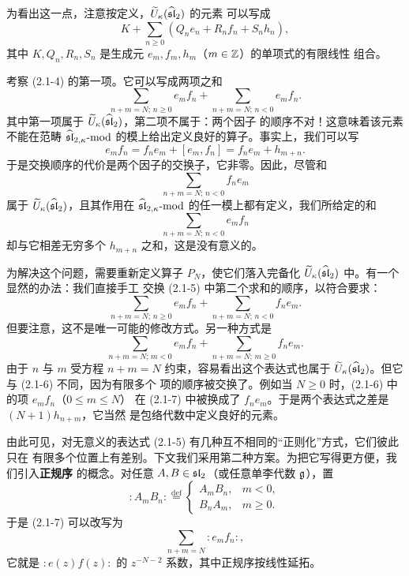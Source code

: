 为看出这一点，注意按定义，$\widetilde U_\kappa(\widehat{\mathfrak{sl}}_2)$ 的元素
可以写成
\[
    K+\sum_{n\ge0}(Q_ne_n+R_nf_n+S_nh_n),
\]
其中 $K,Q_n,R_n,S_n$ 是生成元 $e_m,f_m,h_m$（$m\in\mathbb{Z}$）的单项式的有限线性
组合。

考察 (2.1-4) 的第一项。它可以写成两项之和
\begin{equation}
    \sum_{n+m=N;\,n\ge0}e_mf_n+\sum_{n+m=N;\,n<0}e_mf_n.
    \tag{2.1-5}
\end{equation}
其中第一项属于 $\widetilde U_\kappa(\widehat{\mathfrak{sl}}_2)$，第二项不属于：两个因子
的顺序不对！这意味着该元素不能在范畴 $\widehat{\mathfrak{sl}}_{2,\kappa}\text{-}\mathrm{mod}$
的模上给出定义良好的算子。事实上，我们可以写
\[
    e_mf_n=f_ne_m+[e_m,f_n]=f_ne_m+h_{m+n}.
\]
于是交换顺序的代价是两个因子的交换子，它非零。因此，尽管和
\[
    \sum_{n+m=N;\,n<0}f_ne_m
\]
属于 $\widetilde U_\kappa(\widehat{\mathfrak{sl}}_2)$，且其作用在
$\widehat{\mathfrak{sl}}_{2,\kappa}\text{-}\mathrm{mod}$ 的任一模上都有定义，我们所给定的和
\[
    \sum_{n+m=N;\,n<0}e_mf_n
\]
却与它相差无穷多个 $h_{m+n}$ 之和，这是没有意义的。

为解决这个问题，需要重新定义算子 $P_N$，使它们落入完备化
$\widetilde U_\kappa(\widehat{\mathfrak{sl}}_2)$ 中。有一个显然的办法：我们直接手工
交换 (2.1-5) 中第二个求和的顺序，以符合要求：
\begin{equation}
    \sum_{n+m=N;\,n\ge0}e_mf_n+\sum_{n+m=N;\,n<0}f_ne_m.
    \tag{2.1-6}
\end{equation}
但要注意，这不是唯一可能的修改方式。另一种方式是
\begin{equation}
    \sum_{n+m=N;\,m<0}e_mf_n+\sum_{n+m=N;\,m\ge0}f_ne_m.
    \tag{2.1-7}
\end{equation}
由于 $n$ 与 $m$ 受方程 $n+m=N$ 约束，容易看出这个表达式也属于
$\widetilde U_\kappa(\widehat{\mathfrak{sl}}_2)$。但它与 (2.1-6) 不同，因为有限多个
项的顺序被交换了。例如当 $N\ge0$ 时，(2.1-6) 中的项 $e_mf_n$（$0\le m\le N$）
在 (2.1-7) 中被换成了 $f_ne_m$。于是两个表达式之差是 $(N+1)h_{n+m}$，它当然
是包络代数中定义良好的元素。

由此可见，对无意义的表达式 (2.1-5) 有几种互不相同的“正则化”方式，它们彼此只在
有限多个位置上有差别。下文我们采用第二种方案。为把它写得更方便，我们引入\textbf{正规序}
的概念。对任意 $A,B\in\mathfrak{sl}_2$（或任意单李代数 $\mathfrak{g}$），置
\[
    :\!A_mB_n\!:\overset{\mathrm{def}}{=}
    \begin{cases}
        A_mB_n, & m<0,\\
        B_nA_m, & m\ge0.
    \end{cases}
\]
于是 (2.1-7) 可以改写为
\[
    \sum_{n+m=N}:\!e_mf_n\!:,
\]
它就是 $:\!e(z)f(z)\!:$ 的 $z^{-N-2}$ 系数，其中正规序按线性延拓。

